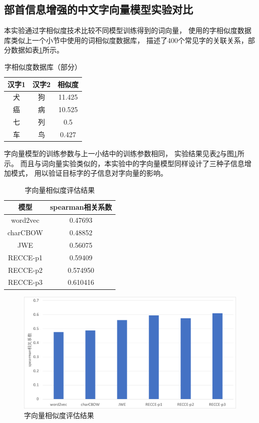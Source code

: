 \documentclass{standalone}
\begin{document}
\subsection{部首信息增强的中文字向量模型实验对比}
本实验通过字相似度技术比较不同模型训练得到的词向量，
使用的字相似度数据库类似上一个小节中使用的词相似度数据库，
描述了400个常见字的关联关系，部分数据如表\ref{charsim_form}所示。

\begin{table}[h]
    \caption{字相似度数据库（部分）}
    \begin{tabular}{|c|c|c|}
        \hline
        汉字1 & 汉字2 & 相似度 \\
        \hline
        犬 & 狗 & 11.425 \\
        \hline
        癌 & 病 & 10.525 \\
        \hline
        七 & 列 & 0.5 \\
        \hline
        车 & 鸟 & 0.427 \\
        \hline
    \end{tabular}
    \label{charsim_form}
    \end{table}
字向量模型的训练参数与上一小结中的训练参数相同，
实验结果见表\ref{char_vec_result}与图\ref{char_sim_pic}所示。
而且与词向量实验类似的，本实验中的字向量模型同样设计了三种子信息增加模式，
用以验证目标字的子信息对字向量的影响。
\begin{table}[!h]
    \caption{字向量相似度评估结果}
    \begin{tabular}{|c|c|}
        \hline
        模型 &  spearman相关系数\\
        \hline
        word2vec & 0.47693 \\
        \hline
        charCBOW & 0.48852 \\
        \hline
        JWE & 0.56075 \\
        \hline
        RECCE-p1 & 0.59409 \\
        \hline
        RECCE-p2 & 0.574950 \\
        \hline
        RECCE-p3 & 0.610416 \\
        \hline
    \end{tabular}
    \label{char_vec_result}
    \end{table}
    \begin{figure}[!h]
        \includegraphics[scale=0.45]{picture/char_sim.pdf}
        \caption{字向量相似度评估结果}
        \label{char_sim_pic}
    \end{figure}
\end{document}
